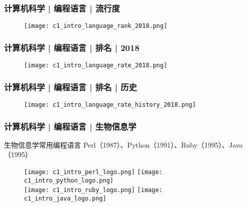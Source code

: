 \begin{frame}
  \frametitle{计算机科学 | 编程语言 | 流行度}
  \begin{figure}
    \centering
    \texttt{[image: c1\_intro\_language\_rank\_2018.png]}
  \end{figure}
\end{frame}

\begin{frame}
  \frametitle{计算机科学 | 编程语言 | 排名 | 2018}
  \begin{figure}
    \centering
    \texttt{[image: c1\_intro\_language\_rate\_2018.png]}
  \end{figure}
\end{frame}


\begin{frame}
  \frametitle{计算机科学 | 编程语言 | 排名 | 历史}
  \begin{figure}
    \centering
    \texttt{[image: c1\_intro\_language\_rate\_history\_2018.png]}
  \end{figure}
\end{frame}

\begin{frame}
  \frametitle{计算机科学 | 编程语言 | 生物信息学}
  \begin{block}{\alert{生物信息学常用编程语言}}
    Perl（1987）、Python（1991）、Ruby（1995）、Java（1995）
  \end{block}
  \begin{figure}
    \centering
    \texttt{[image: c1\_intro\_perl\_logo.png]}
    \hspace{2em}
    \texttt{[image: c1\_intro\_python\_logo.png]}\\
    \texttt{[image: c1\_intro\_ruby\_logo.png]}
    \hspace{11em}
    \texttt{[image: c1\_intro\_java\_logo.png]}
  \end{figure}
\end{frame}

